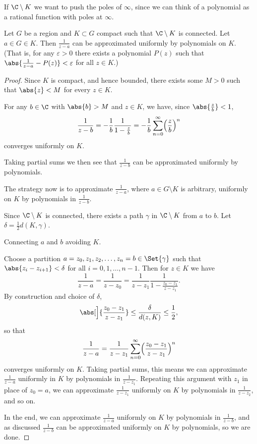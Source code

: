 If $\C \setminus K$ we want to push the poles of $\infty$, since we can think of a polynomial as a rational function with poles at $\infty$.

\begin{lemma}\label{lem10.3}
	Let $G$ be a region and $K \subset G$ compact such that $\C \setminus K$ is connected.
	Let $a \in G \in K$.
	Then $\frac{1}{z - a}$ can be approximated uniformly by polynomials on $K$.
	(That is, for any $\varepsilon > 0$ there exists a polynomial $P(z)$ such that $\abs{\frac{1}{z - a} - P(z)} < \varepsilon$ for all $z \in K$.)
\end{lemma}

\begin{proof}
	Since $K$ is compact, and hence bounded, there exists some $M > 0$ such that $\abs{z} < M$ for every $z \in K$.

	For any $b \in \C$ with $\abs{b} > M$ and $z \in K$, we have, since $\abs{\frac{z}{b}} < 1$,
	\[
		\frac{1}{z - b} = - \frac{1}{b} \frac{1}{1 - \frac{z}{b}} = - \frac{1}{b} \sum_{n = 0}^\infty \Bigl( \frac{z}{b} \Bigr)^n
	\]
	converges uniformly on $K$.

	Taking partial sums we then see that $\frac{1}{z - b}$ can be approximated uniformly by polynomials.

	The strategy now is to approximate $\frac{1}{z - a}$, where $a \in G \setminus K$ is arbitrary, uniformly on $K$ by polynomials in $\frac{1}{z - b}$.

	Since $\C \setminus K$ is connected, there exists a path $\gamma$ in $\C \setminus K$ from $a$ to $b$.
	Let $\delta = \frac{1}{2} d(K, \gamma)$.

	\begin{marginfigure}

		\caption{\label{lem103:fig} Connecting $a$ and $b$ avoiding $K$.}
	\end{marginfigure}

	Choose a partition $a = z_0, z_1, z_2, \dots, z_n = b \in \Set{\gamma}$ such that $\abs{z_i - z_{i + 1}} < \delta$ for all $i = 0, 1, \dots, n - 1$.
	Then for $z \in K$ we have
	\[
		\frac{1}{z - a} = \frac{1}{z - z_0} = \frac{1}{z - z_1} \frac{1}{1 - \frac{z_0 - z_1}{z - z_1}}.
	\]
	By construction and choice of $\delta$,
	\[
		\abs[\Big]{\frac{z_0 - z_1}{z - z_1}} \leq \frac{\delta}{d(z, K)} \leq \frac{1}{2},
	\]
	so that
	\[
		\frac{1}{z - a} = \frac{1}{z - z_1} \sum_{n = 0}^\infty \Bigl( \frac{z_0 - z_1}{z - z_1} \Bigr)^n
	\]
	converges uniformly on $K$.
	Taking partial sums, this means we can approximate $\frac{1}{z - a}$ uniformly in $K$ by polynomials in $\frac{1}{z - z_1}$.
	Repeating this argument with $z_1$ in place of $z_0 = a$, we can approximate $\frac{1}{z - z_1}$ uniformly on $K$ by polynomials in $\frac{1}{z - z_2}$, and so on.

	In the end, we can approximate $\frac{1}{z - a}$ uniformly on $K$ by polynomials in $\frac{1}{z - b}$, and as discussed $\frac{1}{z - b}$ can be approximated uniformly on $K$ by polynomials, so we are done.
\end{proof}


